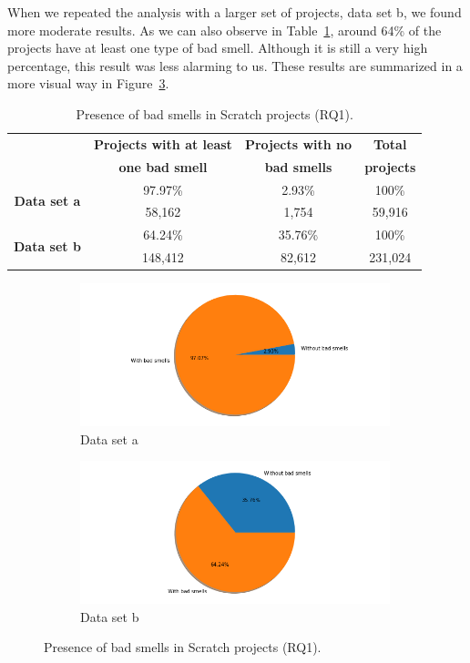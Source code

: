 When we repeated the analysis with a larger set of projects, data set b, we found more moderate results. As we can also observe in Table~\ref{table:result_rq1}, around 64\% of the projects have at least one type of bad smell. Although it is still a very high percentage, this result was less alarming to us. These results are summarized in a more visual way in Figure~\ref{fig:rq1_result}.

\begin{table}
 \begin{center}
  \begin{tabular}{|c|c|c|c|}
    \hline
     & \textbf{Projects with at least} & \textbf{Projects with no} & \textbf{Total} \\ 
     & \textbf{one bad smell} & \textbf{bad smells} & \textbf{projects} \\ \hline
     \multirow{2}{*}{\textbf{Data set a}} & 97.97\% & 2.93\% & 100\% \\ 
     & 58,162 & 1,754 & 59,916 \\
     \hline
    \multirow{2}{*}{\textbf{Data set b}} & 64.24\% & 35.76\% & 100\% \\ 
     & 148,412 & 82,612 & 231,024 \\ \hline
  \end{tabular}
  \caption{Presence of bad smells in Scratch projects (RQ1).}
  \label{table:result_rq1}
 \end{center}
\end{table}

\begin{figure}
  \begin{subfigure}{.5\textwidth}
    \centering
    \includegraphics[width=9cm]{img/rq1_dataset_a.png}
    \caption{Data set a}
    \label{subfig:rq1_results_a}
  \end{subfigure}
  \begin{subfigure}{.5\textwidth}
    \centering
    \includegraphics[width=9cm]{img/rq1_dataset_b.png}
    \caption{Data set b}
    \label{subfig:rq1_results_b}
  \end{subfigure}
  \caption{Presence of bad smells in Scratch projects (RQ1).}
  \label{fig:rq1_result}
\end{figure}  

